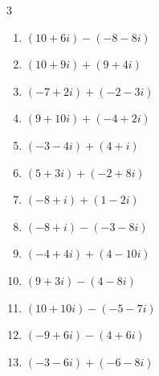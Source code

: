 \begin{multicols}{3}
\begin{enumerate}
  \item $\displaystyle (10+6i) - (-8-8i)$

        \phantom{$\displaystyle =18+14i$}

  \item $\displaystyle (10+9i) + (9+4i)$

        \phantom{$\displaystyle =19+13i$}

  \item $\displaystyle (-7+2i) + (-2-3i)$

        \phantom{$\displaystyle =-9-i$}

  \item $\displaystyle (9+10i) + (-4+2i)$

        \phantom{$\displaystyle =5+12i$}

  \item $\displaystyle (-3-4i) + (4+i)$

        \phantom{$\displaystyle =1-3i$}

  \item $\displaystyle (5+3i) + (-2+8i)$

        \phantom{$\displaystyle =3+11i$}

  \item $\displaystyle (-8+i) + (1-2i)$

        \phantom{$\displaystyle =-7-i$}

  \item $\displaystyle (-8+i) - (-3-8i)$

        \phantom{$\displaystyle =-5+9i$}

  \item $\displaystyle (-4+4i) + (4-10i)$

        \phantom{$\displaystyle =-6i$}

  \item $\displaystyle (9+3i) - (4-8i)$

        \phantom{$\displaystyle =5+11i$}

  \item $\displaystyle (10+10i) - (-5-7i)$

        \phantom{$\displaystyle =15+17i$}

  \item $\displaystyle (-9+6i) - (4+6i)$

        \phantom{$\displaystyle =-13$}

  \item $\displaystyle (-3-6i) + (-6-8i)$

        \phantom{$\displaystyle =-9-14i$}


\end{enumerate}
\end{multicols}
